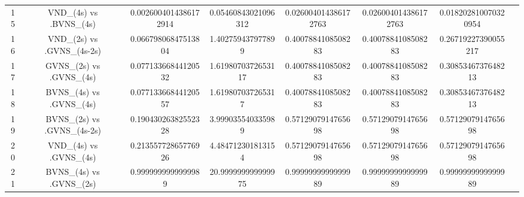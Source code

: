 \documentclass[a4paper,10pt]{article}
\begin{document}
\begin{landscape}
\begin{table}[!htp]
\begin{tabular}{cccccccc}
15&VND_(4s) vs .BVNS_(4s)&0.0026004014386172914&0.05460843021096312&0.026004014386172763&0.026004014386172763&0.018202810070320954\\
16&VND_(2s) vs .GVNS_(4s-2s)&0.06679806847513804&1.402759437977899&0.4007884108508283&0.4007884108508283&0.26719227390055217\\
17&GVNS_(2s) vs .GVNS_(4s)&0.07713366844120532&1.6198070372653117&0.4007884108508283&0.4007884108508283&0.3085346737648213\\
18&BVNS_(4s) vs .GVNS_(4s)&0.07713366844120557&1.619807037265317&0.4007884108508283&0.4007884108508283&0.3085346737648213\\
19&BVNS_(2s) vs .GVNS_(4s-2s)&0.19043026382552328&3.999035540335989&0.5712907914765698&0.5712907914765698&0.5712907914765698\\
20&VND_(4s) vs .GVNS_(4s)&0.21355772865776926&4.484712301813154&0.5712907914765698&0.5712907914765698&0.5712907914765698\\
21&BVNS_(4s) vs .GVNS_(2s)&0.9999999999999989&20.999999999999975&0.9999999999999989&0.9999999999999989&0.9999999999999989\\
\hline
\end{tabular}
\end{table}

\end{landscape}
\end{document}
